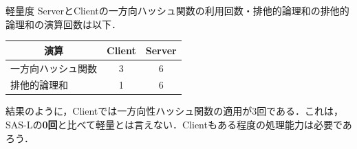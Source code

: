 \documentclass[t,aspectratio=169,12pt]{beamer}
\begin{document}
\begin{frame}[c]{}
    \begin{block}{軽量度}
        {\ttfamily Server}と{\ttfamily Client}の一方向ハッシュ関数の利用回数・排他的論理和の排他的論理和の演算回数は以下．\\
        \begin{table}[h]
            \renewcommand{\arraystretch}{1.4}
            \begin{tabular}{lcc}
                \multicolumn{1}{c}{演算} & {\ttfamily Client} & {\ttfamily Server} \\
                \hline
                一方向ハッシュ関数              & 3                  & 6                  \\
                排他的論理和                 & 1                  & 6                  \\
                \hline
            \end{tabular}
        \end{table}
        結果のように，{\ttfamily Client}では一方向性ハッシュ関数の適用が3回である．これは，SAS-Lの{\bfseries 0回}と比べて軽量とは言えない．{\ttfamily Client}もある程度の処理能力は必要であろう．
    \end{block}
\end{frame}
\end{document}
